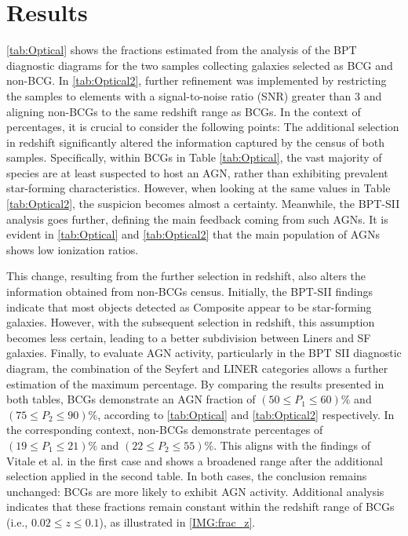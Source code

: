 \chapter{Results}
\autoref{tab:Optical} shows the fractions estimated from the analysis of the BPT diagnostic diagrams for the two samples collecting galaxies selected as BCG and non-BCG. In \autoref{tab:Optical2}, further refinement was implemented by restricting the samples to elements with a signal-to-noise ratio (SNR) greater than 3 and aligning non-BCGs to the same redshift range as BCGs.
In the context of percentages, it is crucial to consider the following points: The additional selection in redshift significantly altered the information captured by the census of both samples. Specifically, within BCGs in Table \autoref{tab:Optical}, the vast majority of species are at least suspected to host an AGN, rather than exhibiting prevalent star-forming characteristics. However, when looking at the same values in Table \autoref{tab:Optical2}, the suspicion becomes almost a certainty. Meanwhile, the BPT-SII analysis goes further, defining the main feedback coming from such AGNs. It is evident in \autoref{tab:Optical} and \autoref{tab:Optical2} that the main population of AGNs shows low ionization ratios.

This change, resulting from the further selection in redshift, also alters the information obtained from non-BCGs census. Initially, the BPT-SII findings indicate that most objects detected as Composite appear to be star-forming galaxies. However, with the subsequent selection in redshift, this assumption becomes less certain, leading to a better subdivision between Liners and SF galaxies.
Finally, to evaluate AGN activity, particularly in the BPT SII diagnostic diagram, the combination of the Seyfert and LINER categories allows a further estimation of the maximum percentage. By comparing the results presented in both tables, BCGs demonstrate an AGN fraction of $(50 \leq P_1 \leq 60)\%$ and $(75 \leq P_2 \leq 90)\%$, according to \autoref{tab:Optical} and \autoref{tab:Optical2} respectively.
In the corresponding context, non-BCGs demonstrate percentages of $(19 \leq P_1 \leq 21)\%$ and $(22 \leq P_2 \leq 55)\%$. This aligns with the findings of Vitale et al. \cite{2012A&A...546A..17V} in the first case and shows a broadened range after the additional selection applied in the second table. In both cases, the conclusion remains unchanged: BCGs are more likely to exhibit AGN activity.
Additional analysis indicates that these fractions remain constant within the redshift range of BCGs (i.e., $0.02 \leq z \leq 0.1$), as illustrated in \autoref{IMG:frac_z}.

